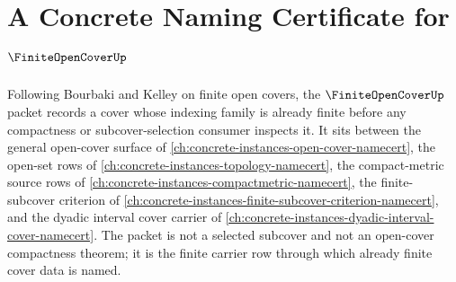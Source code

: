 \chapter{A Concrete Naming Certificate for $\FiniteOpenCoverUp$}
\label{ch:concrete-instances-finite-open-cover-namecert}

Following Bourbaki and Kelley on finite open covers, the $\FiniteOpenCoverUp$ packet records a cover whose indexing family is already finite before any compactness or subcover-selection consumer inspects it. It sits between the general open-cover surface of \autoref{ch:concrete-instances-open-cover-namecert}, the open-set rows of \autoref{ch:concrete-instances-topology-namecert}, the compact-metric source rows of \autoref{ch:concrete-instances-compactmetric-namecert}, the finite-subcover criterion of \autoref{ch:concrete-instances-finite-subcover-criterion-namecert}, and the dyadic interval cover carrier of \autoref{ch:concrete-instances-dyadic-interval-cover-namecert}. The packet is not a selected subcover and not an open-cover compactness theorem; it is the finite carrier row through which already finite cover data is named.

